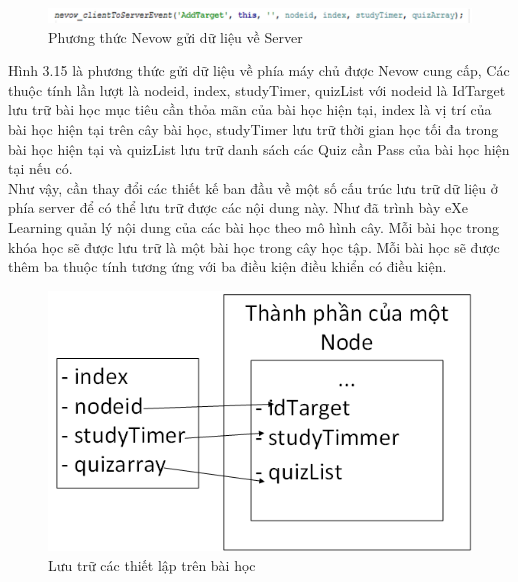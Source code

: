 		\begin{center}
	\begin{figure}[htp]
		\begin{center}
			\includegraphics[width=15cm]{Chapter3/Pictures/picture315.png}
		\end{center}
		\caption{Phương thức Nevow gửi dữ liệu về Server}
		\label{refpicture416}
	\end{figure}
\end{center}

	Hình 3.15 là phương thức gửi dữ liệu về phía máy chủ được Nevow cung cấp, Các thuộc tính lần lượt là nodeid, index, studyTimer, quizList với nodeid là IdTarget lưu trữ bài học mục tiêu cần thỏa mãn của bài học hiện tại, index là vị trí của bài học hiện tại trên cây bài học, studyTimer lưu trữ thời gian học tối đa trong bài học hiện tại và quizList lưu trữ danh sách các Quiz cần Pass của bài học hiện tại nếu có.\\

	
	Như vậy, cần thay đổi các thiết kế ban đầu về một số cấu trúc lưu trữ dữ liệu ở phía server để có thể lưu trữ được các nội dung này. Như đã trình bày eXe Learning quản lý nội dung của các bài học theo mô hình cây. Mỗi bài học trong khóa học sẽ được lưu trữ là một bài học trong cây học tập. Mỗi bài học sẽ được thêm ba thuộc tính tương ứng với ba điều kiện điều khiển có điều kiện.


		\begin{center}
	\begin{figure}[htp]
		\begin{center}
			\includegraphics[width=15cm]{Chapter3/Pictures/picture316.png}
		\end{center}
		\caption{Lưu trữ các thiết lập trên bài học}
		\label{refpicture413}
	\end{figure}
\end{center}

